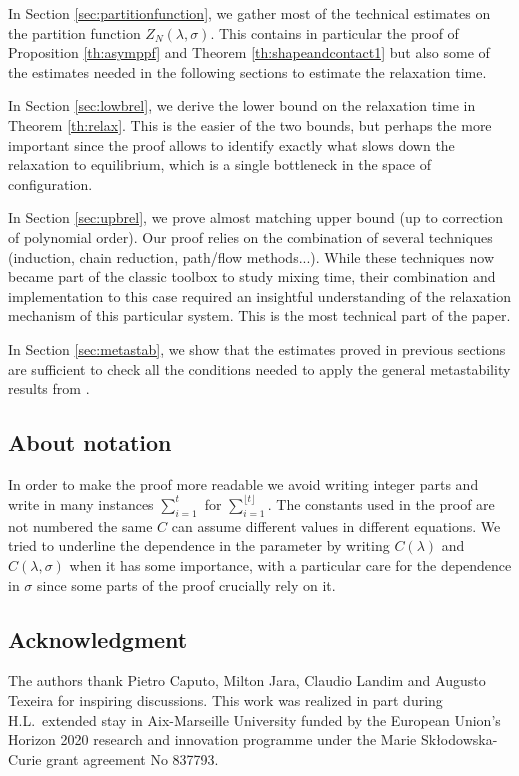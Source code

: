 \documentclass[reqno,11pt]{amsart}
\numberwithin{equation}{section}
\newcommand{\gl}{\lambda}
\begin{document}
In Section \ref{sec:partitionfunction}, we gather most of the technical estimates on the partition function $Z_N(\gl,\sigma)$. This contains in particular the proof of 
Proposition \ref{th:asymppf} and Theorem \ref{th:shapeandcontact1} but also some of the estimates needed in the following sections to estimate the relaxation time.

\medskip

In Section
\ref{sec:lowbrel}, we derive the lower bound on the relaxation time in Theorem \ref{th:relax}. This is the easier of the two bounds, but perhaps the more important since the proof allows to identify exactly what slows down the relaxation to equilibrium, which is a single bottleneck in the space of configuration.

\medskip

In Section \ref{sec:upbrel}, we prove almost matching upper bound (up to correction of polynomial order). Our proof relies on the combination of several techniques (induction, chain reduction, path/flow methods...). While these techniques now became part of the classic toolbox to study mixing time, their combination and implementation to this case required an insightful understanding of the relaxation mechanism of this particular system. This is the most technical part of the paper.

\medskip

In Section \ref{sec:metastab}, we show that the estimates proved in previous sections are sufficient to check all the conditions needed to apply the general metastability results from  \cite{beltran2015martingale}.




\subsection*{About notation} In order to make the proof more readable we avoid writing integer parts and write in many instances $\sum_{i=1}^t$ for $\sum_{i=1}^{\lfloor t\rfloor}$. The constants used in the proof are not numbered the same $C$ can assume different values in different equations. We tried to underline the dependence in the parameter by writing $C(\gl)$ and $C(\gl,\sigma)$ when it has some importance, with a particular care for the dependence in $\sigma$ since some parts of the proof crucially rely on it.





 \subsection*{Acknowledgment}
The authors thank Pietro Caputo, Milton Jara,  Claudio Landim and Augusto Texeira for inspiring discussions. This work was realized in part during H.L.\ extended stay in Aix-Marseille University funded by the European Union’s Horizon 2020 research and innovation programme under the Marie Skłodowska-Curie grant agreement No 837793.
\end{document}
